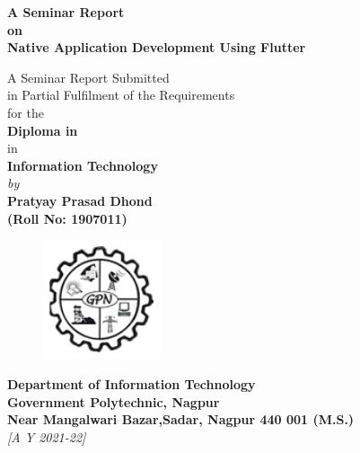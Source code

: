 \begin{titlepage}
\enlargethispage{3cm}

\begin{center}

\vspace*{-1cm}

\textbf{\Large A Seminar Report \\on\\ Native Application Development Using Flutter }\\[10pt]

\vspace*{0.5cm}


                         A Seminar Report Submitted \\
                     in Partial Fulfilment of the Requirements  \\
                     for the   \\
                          \vspace{5mm}
                   {\Large \bf Diploma in  } \\
                   in \\
                   {\large \bf Information Technology } \\

                      \vspace{10mm}
                   {\em  by} \\ \vspace{3mm}
             {\large \bf Pratyay Prasad Dhond} \\
{\large \bf (Roll No: 1907011)}\\[.3in]

\vfill

\begin{figure}[h]
  \begin{center}
  \includegraphics[height=35mm]{Images & Logos/gpn_logo.png}
  \end{center}
\end{figure}
\vspace*{0.1cm}

{\bf\large Department of Information Technology} \\%
{\bf\large Government Polytechnic, Nagpur}\\%
{\bf\large Near Mangalwari Bazar,Sadar, Nagpur 440 001 (M.S.) }\\%
{\it\large [A Y 2021-22]}

\end{center}

\end{titlepage}

\clearpage

